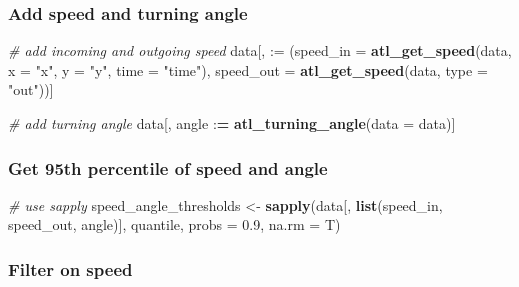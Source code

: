 \documentclass[
]{scrartcl}
\newenvironment{Shaded}{}{}
\newcommand{\CommentTok}[1]{\textcolor[rgb]{0.38,0.63,0.69}{\textit{#1}}}
\newcommand{\DataTypeTok}[1]{\textcolor[rgb]{0.56,0.13,0.00}{#1}}
\newcommand{\ErrorTok}[1]{\textcolor[rgb]{1.00,0.00,0.00}{\textbf{#1}}}
\newcommand{\FloatTok}[1]{\textcolor[rgb]{0.25,0.63,0.44}{#1}}
\newcommand{\KeywordTok}[1]{\textcolor[rgb]{0.00,0.44,0.13}{\textbf{#1}}}
\newcommand{\NormalTok}[1]{#1}
\newcommand{\OperatorTok}[1]{\textcolor[rgb]{0.40,0.40,0.40}{#1}}
\newcommand{\StringTok}[1]{\textcolor[rgb]{0.25,0.44,0.63}{#1}}
\begin{document}
\hypertarget{add-speed-and-turning-angle}{%
\subsubsection{Add speed and turning angle}\label{add-speed-and-turning-angle}}

\begin{Shaded}
\begin{Highlighting}[]
\CommentTok{\# add incoming and outgoing speed}
\NormalTok{data[, }\StringTok{\textasciigrave{}}\DataTypeTok{:=}\StringTok{\textasciigrave{}}\NormalTok{ (}\DataTypeTok{speed\_in =} \KeywordTok{atl\_get\_speed}\NormalTok{(data, }
                                      \DataTypeTok{x =} \StringTok{"x"}\NormalTok{, }
                                      \DataTypeTok{y =} \StringTok{"y"}\NormalTok{, }
                                      \DataTypeTok{time =} \StringTok{"time"}\NormalTok{),}
             \DataTypeTok{speed\_out =} \KeywordTok{atl\_get\_speed}\NormalTok{(data, }\DataTypeTok{type =} \StringTok{"out"}\NormalTok{))]}

\CommentTok{\# add turning angle}
\NormalTok{data[, angle }\OperatorTok{:}\ErrorTok{=}\StringTok{ }\KeywordTok{atl\_turning\_angle}\NormalTok{(}\DataTypeTok{data =}\NormalTok{ data)]}
\end{Highlighting}
\end{Shaded}

\hypertarget{get-95th-percentile-of-speed-and-angle}{%
\subsubsection{Get 95th percentile of speed and angle}\label{get-95th-percentile-of-speed-and-angle}}

\begin{Shaded}
\begin{Highlighting}[]
\CommentTok{\# use sapply}
\NormalTok{speed\_angle\_thresholds <{-}}\StringTok{ }
\StringTok{  }\KeywordTok{sapply}\NormalTok{(data[, }\KeywordTok{list}\NormalTok{(speed\_in, speed\_out, angle)], }
\NormalTok{       quantile, }\DataTypeTok{probs =} \FloatTok{0.9}\NormalTok{, }\DataTypeTok{na.rm =}\NormalTok{ T)}
\end{Highlighting}
\end{Shaded}

\hypertarget{filter-on-speed}{%
\subsubsection{Filter on speed}\label{filter-on-speed}}
\end{document}
